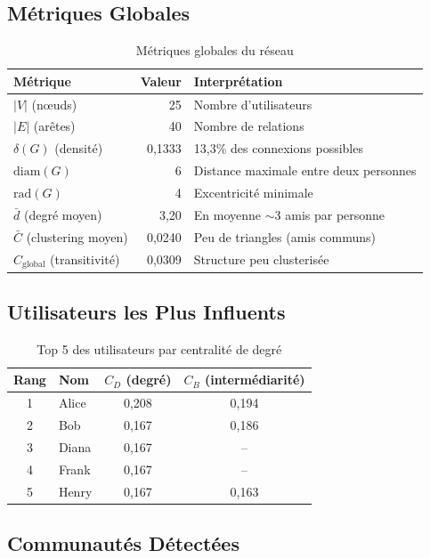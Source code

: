\documentclass[12pt,a4paper]{article}
\begin{document}
\subsection{Métriques Globales}

\begin{table}[H]
\centering
\begin{tabular}{lrl}
\toprule
\textbf{Métrique} & \textbf{Valeur} & \textbf{Interprétation} \\
\midrule
$|V|$ (n\oe{}uds) & 25 & Nombre d'utilisateurs \\
$|E|$ (arêtes) & 40 & Nombre de relations \\
$\delta(G)$ (densité) & 0,1333 & 13,3\% des connexions possibles \\
$\text{diam}(G)$ & 6 & Distance maximale entre deux personnes \\
$\text{rad}(G)$ & 4 & Excentricité minimale \\
$\bar{d}$ (degré moyen) & 3,20 & En moyenne $\sim$3 amis par personne \\
$\bar{C}$ (clustering moyen) & 0,0240 & Peu de triangles (amis communs) \\
$C_{\text{global}}$ (transitivité) & 0,0309 & Structure peu clusterisée \\
\bottomrule
\end{tabular}
\caption{Métriques globales du réseau}
\end{table}

\subsection{Utilisateurs les Plus Influents}

\begin{table}[H]
\centering
\begin{tabular}{clcc}
\toprule
\textbf{Rang} & \textbf{Nom} & \textbf{$C_D$ (degré)} & \textbf{$C_B$ (intermédiarité)} \\
\midrule
1 & Alice & 0,208 & 0,194 \\
2 & Bob & 0,167 & 0,186 \\
3 & Diana & 0,167 & -- \\
4 & Frank & 0,167 & -- \\
5 & Henry & 0,167 & 0,163 \\
\bottomrule
\end{tabular}
\caption{Top 5 des utilisateurs par centralité de degré}
\end{table}

\subsection{Communautés Détectées}
\end{document}
